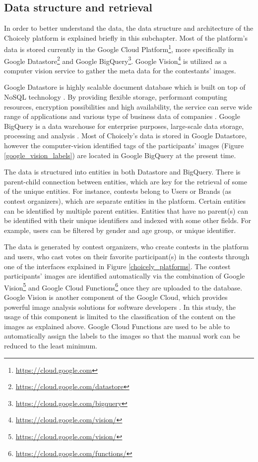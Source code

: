 \subsection{Data structure and retrieval}
    In order to better understand the data, the data structure and architecture of the Choicely platform is explained briefly in this subchapter. Most of the platform's data is stored currently in the Google Cloud Platform\footnote{\url{https://cloud.google.com}}, more specifically in Google Datastore\footnote{\url{https://cloud.google.com/datastore}} and Google BigQuery\footnote{\url{https://cloud.google.com/bigquery}}. Google Vision\footnote{\url{https://cloud.google.com/vision/}} is utilized as a computer vision service to gather the meta data for the contestants' images. 
    
    Google Datastore is highly scalable document database which is built on top of NoSQL technology \cite{google-datastore-overview}. By providing flexible storage, performant computing resources, encryption possibilities and high availability, the service can serve wide range of applications and various type of business data of companies \cite{google-datastore-overview}. Google BigQuery is a data warehouse for enterprise purposes, large-scale data storage, processing and analysis \cite{google-bigquery-overview}. Most of Choicely's data is stored in Google Datastore, however the computer-vision identified tags of the participants' images (Figure \ref{google_vision_labels}) are located in Google BigQuery at the present time.
    
    The data is structured into entities in both Datastore and BigQuery. There is parent-child connection between entities, which are key for the retrieval of some of the unique entities. For instance, contests belong to Users or Brands (as contest organizers), which are separate entities in the platform. Certain entities can be identified by multiple parent entities. Entities that have no parent(s) can be identified with their unique identifiers and indexed with some other fields. For example, users can be filtered by gender and age group, or unique identifier. 
    
    The data is generated by contest organizers, who create contests in the platform and users, who cast votes on their favorite participant(s) in the contests through one of the interfaces explained in Figure \ref{choicely_platforms}. The contest participants' images are identified automatically via the combination of Google Vision\footnote{\url{https://cloud.google.com/vision/}} and Google Cloud Functions\footnote{\url{https://cloud.google.com/functions/}} once they are uploaded to the database. Google Vision is another component of the Google Cloud, which provides powerful image analysis solutions for software developers \cite{google-vision-overview}. In this study, the usage of this component is limited to the classification of the content on the images as explained above. Google Cloud Functions are used to be able to automatically assign the labels to the images so that the manual work can be reduced to the least minimum. 


